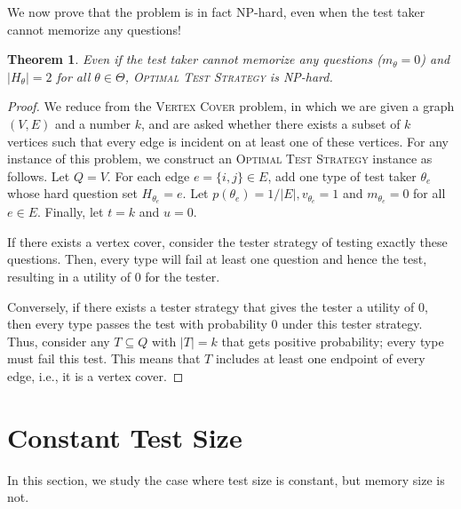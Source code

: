 \documentclass{article}
\newtheorem{theorem}{Theorem}
\begin{document}
We now prove that the problem is in fact NP-hard, even when the test taker
cannot memorize any questions!

\begin{theorem}\label{thm:test-hardness}
Even if the test taker cannot memorize any questions ($m_\theta = 0$) and $|H_\theta| = 2$ for all
$\theta \in \Theta$,
\textsc{Optimal
Test Strategy} is NP-hard.%
\end{theorem}
\begin{proof}
We reduce from the 
\textsc{Vertex Cover} problem, in which we are given a graph $(V,E)$ and a
number $k$, and are asked whether there exists a subset of $k$ vertices such
that every edge is incident on at least one of these vertices.
For any instance of this problem, we construct an \textsc{Optimal Test
	Strategy} instance as follows.
      Let $Q=V$.  For each edge $e = \{i, j\} \in E$, add one type of test
      taker $\theta_e$ whose hard question set $H_{\theta_e} = e$.  Let
      $p(\theta_e) = 1/|E|, v_{\theta_e} = 1$ and $m_{\theta_e} = 0$ for
      all $e \in E$.  Finally, let $t=k$ and $u = 0$.

If there exists a vertex cover, consider the tester strategy of testing
exactly these questions.  Then, every type will fail at least one question
and hence the test, resulting
in a utility of $0$ for the tester.

Conversely, if there exists a tester strategy that gives the tester a
utility of $0$, then every type passes the test with probability $0$ under
this tester strategy.  Thus, consider any $T \subseteq Q$ with $|T| = k$ that
gets positive probability; every type must fail this test.  This means that
$T$ includes at least one endpoint of every edge, i.e., it is a vertex cover.
\end{proof}

\section{Constant Test Size}

In this section, we study the case where test size is constant, but memory
size is not.
\end{document}
